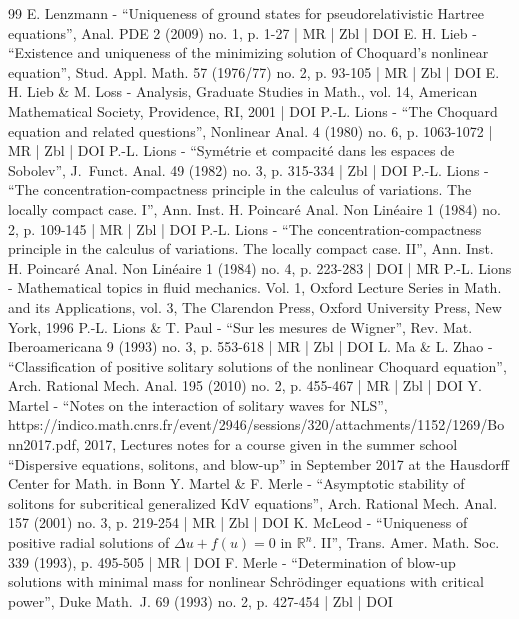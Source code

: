\documentclass[10pt]{amsart}
\theoremstyle{definition}
\begin{document}
\begin{thebibliography}{99}
E. Lenzmann - “Uniqueness of ground states for pseudorelativistic Hartree equations”, Anal. PDE 2 (2009) no. 1, p. 1-27 | MR | Zbl | DOI
E. H. Lieb - “Existence and uniqueness of the minimizing solution of Choquard’s nonlinear equation”, Stud. Appl. Math. 57 (1976/77) no. 2, p. 93-105 | MR | Zbl | DOI
E. H. Lieb \& M. Loss - Analysis, Graduate Studies in Math., vol. 14, American Mathematical Society, Providence, RI, 2001 | DOI
P.-L. Lions - “The Choquard equation and related questions”, Nonlinear Anal. 4 (1980) no. 6, p. 1063-1072 | MR | Zbl | DOI
P.-L. Lions - “Symétrie et compacité dans les espaces de Sobolev”, J. Funct. Anal. 49 (1982) no. 3, p. 315-334 | Zbl | DOI
P.-L. Lions - “The concentration-compactness principle in the calculus of variations. The locally compact case. I”, Ann. Inst. H. Poincaré Anal. Non Linéaire 1 (1984) no. 2, p. 109-145 | MR | Zbl | DOI
P.-L. Lions - “The concentration-compactness principle in the calculus of variations. The locally compact case. II”, Ann. Inst. H. Poincaré Anal. Non Linéaire 1 (1984) no. 4, p. 223-283 | DOI | MR
P.-L. Lions - Mathematical topics in fluid mechanics. Vol. 1, Oxford Lecture Series in Math. and its Applications, vol. 3, The Clarendon Press, Oxford University Press, New York, 1996
P.-L. Lions \& T. Paul - “Sur les mesures de Wigner”, Rev. Mat. Iberoamericana 9 (1993) no. 3, p. 553-618 | MR | Zbl | DOI
L. Ma \& L. Zhao - “Classification of positive solitary solutions of the nonlinear Choquard equation”, Arch. Rational Mech. Anal. 195 (2010) no. 2, p. 455-467 | MR | Zbl | DOI
Y. Martel - “Notes on the interaction of solitary waves for NLS”, https://indico.math.cnrs.fr/event/2946/sessions/320/attachments/1152/1269/Bonn2017.pdf, 2017, Lectures notes for a course given in the summer school “Dispersive equations, solitons, and blow-up” in September 2017 at the Hausdorff Center for Math. in Bonn
Y. Martel \& F. Merle - “Asymptotic stability of solitons for subcritical generalized KdV equations”, Arch. Rational Mech. Anal. 157 (2001) no. 3, p. 219-254 | MR | Zbl | DOI
K. McLeod - “Uniqueness of positive radial solutions of ${\Delta u+f(u)=0}$ in $\mathbb{R}^ n$. II”, Trans. Amer. Math. Soc. 339 (1993), p. 495-505 | MR | DOI
F. Merle - “Determination of blow-up solutions with minimal mass for nonlinear Schrödinger equations with critical power”, Duke Math. J. 69 (1993) no. 2, p. 427-454 | Zbl | DOI

\end{thebibliography}
\end{document}
